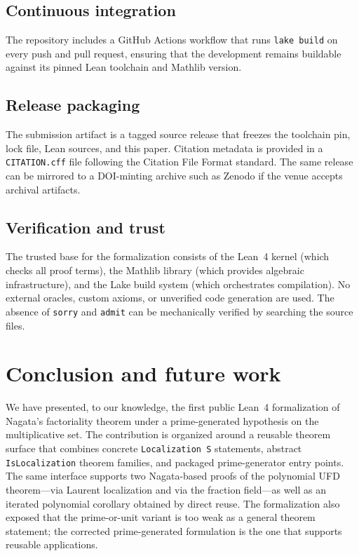 \documentclass[11pt]{article}
\theoremstyle{plain}
\theoremstyle{definition}
\theoremstyle{remark}
\newcommand{\li}[1]{\texorpdfstring{\texttt{#1}}{#1}}
\begin{document}
\subsection{Continuous integration}

The repository includes a GitHub Actions workflow that runs \li{lake build} on
every push and pull request, ensuring that the development remains buildable
against its pinned Lean toolchain and Mathlib version.

\subsection{Release packaging}

The submission artifact is a tagged source release that freezes the toolchain
pin, lock file, Lean sources, and this paper.  Citation metadata is provided in
a \li{CITATION.cff} file following the Citation File Format standard.  The same
release can be mirrored to a DOI-minting archive such as Zenodo if the venue
accepts archival artifacts.

\subsection{Verification and trust}

The trusted base for the formalization consists of the Lean~4 kernel (which
checks all proof terms), the Mathlib library (which provides algebraic
infrastructure), and the Lake build system (which orchestrates compilation).
No external oracles, custom axioms, or unverified code generation are used.
The absence of \li{sorry} and \li{admit} can be mechanically verified by
searching the source files.


\section{Conclusion and future work}\label{sec:conclusion}

We have presented, to our knowledge, the first public Lean~4 formalization of
Nagata's factoriality theorem under a prime-generated hypothesis on the
multiplicative set.  The contribution is organized around a reusable theorem
surface that combines concrete \li{Localization\,S} statements, abstract
\li{IsLocalization} theorem families, and packaged prime-generator entry
points.  The same interface supports two Nagata-based proofs of the polynomial
UFD theorem---via Laurent localization and via the fraction field---as well as
an iterated polynomial corollary obtained by direct reuse.  The formalization
also exposed that the prime-or-unit variant is too weak as a general theorem
statement; the corrected prime-generated formulation is the one that supports
reusable applications.
\end{document}
